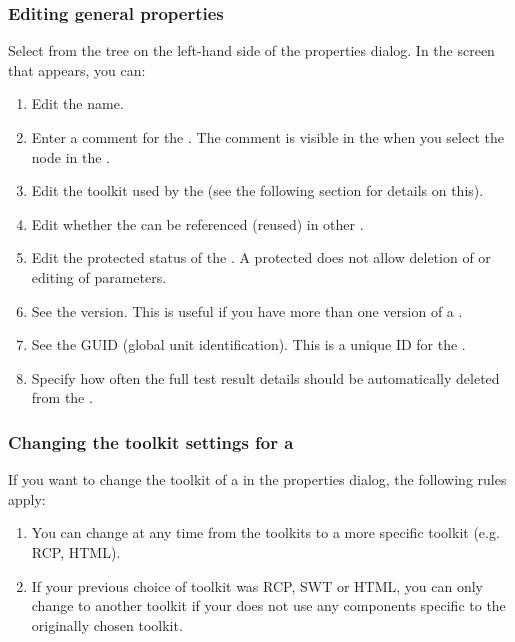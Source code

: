 \subsubsection{Editing general \gdproject{} properties}
\label{ProjPropertiesGeneral}
Select  from the tree on the left-hand side of the \gdproject{} properties dialog. In the screen that appears, you can:
\begin{enumerate}
\item Edit the \gdproject{} name. 
\item Enter a comment for the \gdproject{}. The comment is visible in the \gdpropview{} when you select the \gdproject{} node in the \gdtestsuitebrowser{}.
\item Edit the toolkit used by the \gdproject{} (see the following section  for details on this). 
\item Edit whether the \gdproject{} can be referenced (reused) in other \gdprojects{}.
\item Edit the protected status of the \gdproject{}. A protected \gdproject{} does not allow deletion of \gdcases{} or editing of parameters. 
\item See the \gdproject{} version. This is useful if you have more than one version of a \gdproject{}. 
\item See the GUID (global unit identification). This is a unique ID for the \gdproject{}. 
\item Specify how often the full test result details  should be automatically deleted from the \gddb{}.
\end{enumerate}

\subsubsection{Changing the toolkit settings for a \gdproject{}}
\label{ProjPropertiesChangingToolkit}
If you want to change the toolkit of a \gdproject{} in the \gdproject{} properties dialog, the following rules apply:
\begin{enumerate}
\item You can change at any time from the  toolkits to a more specific toolkit (e.g. RCP, HTML). 
\item If your previous choice of toolkit was RCP, SWT or HTML, you can only change to another toolkit if your \gdproject{} does not use any components specific to the originally chosen toolkit. 
\end{enumerate}

